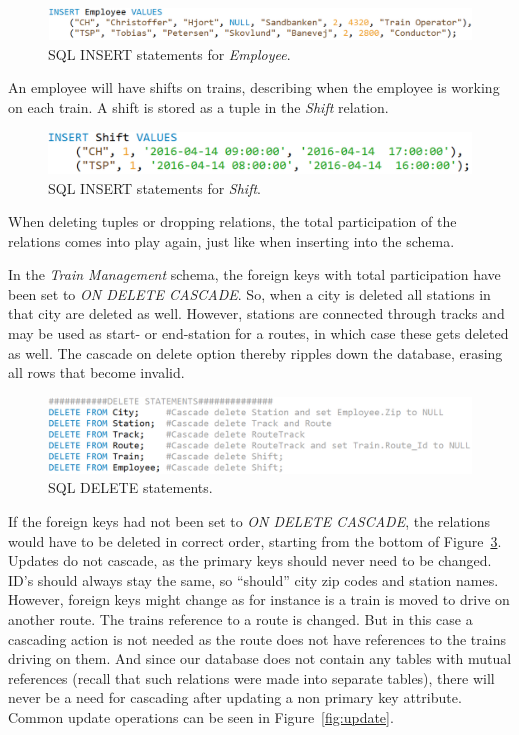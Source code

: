 \begin{figure}[ht!]
    \centering
    \includegraphics[scale=.5]{img/INSERT_Statements_Employee}
    \caption{SQL INSERT statements for \emph{Employee}.}
    \label{fig:ins:employee}
\end{figure}

An employee will have shifts on trains, describing when the employee is working 
on each train. A shift is stored as a tuple in the \emph{Shift} relation.

\begin{figure}[ht!]
    \centering
    \includegraphics[scale=.5]{img/INSERT_Statements_Shift}
    \caption{SQL INSERT statements for \emph{Shift}.}
    \label{fig:ins:shift}
\end{figure}

When deleting tuples or dropping relations, the total participation of the 
relations comes into play again, just like when inserting into the schema.

In the \emph{Train Management} schema, the foreign keys with total 
participation have been set to \emph{ON DELETE CASCADE}. So, when a city is 
deleted all stations in that city are deleted as well. However, stations are 
connected through tracks and may be used as start- or end-station for a routes, 
in which case these gets deleted as well. The cascade on delete option thereby 
ripples down the database, erasing all rows that become invalid.

\begin{figure}[ht!]
    \centering
    \includegraphics[scale=.5]{img/DELETE_Statements}
    \caption{SQL DELETE statements.}
    \label{fig:delete}
\end{figure}

If the foreign keys had not been set to \emph{ON DELETE CASCADE}, the relations 
would have to be deleted in correct order, starting from the bottom of 
Figure~\ref{fig:delete}.
Updates do not cascade, as the primary keys should never need to be changed. 
ID's should always stay the same, so ``should'' city zip codes and station 
names. However, foreign keys might change as for instance is a train is moved 
to drive on another route. The trains reference to a route is changed. But in 
this case a cascading action is not needed as the route does not have 
references to the trains driving on them. And since our database does not 
contain any tables with mutual references (recall that such relations were made 
into separate tables), there will never be a need for cascading after updating 
a non primary key attribute. Common update operations can be seen in 
Figure~\ref{fig:update}.


